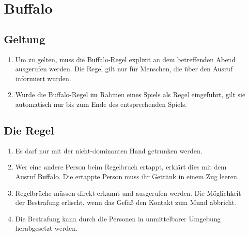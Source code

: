 \chapter{Buffalo}
\section{Geltung}
\begin{enumerate}[label={(\arabic*)}]
    \item
    Um zu gelten, muss die Buffalo-Regel explizit an dem betreffenden Abend ausgerufen werden.
    Die Regel gilt nur für Menschen, die über den Ausruf informiert wurden.

    \item
    Wurde die Buffalo-Regel im Rahmen eines Spiels als Regel eingeführt, gilt sie automatisch nur bis zum Ende des entsprechenden Spiels.
\end{enumerate}

\section{Die Regel}
\begin{enumerate}[label={(\arabic*)}]
    \item
    Es darf nur mit der nicht-dominanten Hand getrunken werden.

    \item
    Wer eine andere Person beim Regelbruch ertappt, erklärt dies mit dem Ausruf \glqq{}Buffalo\grqq{}.
    Die ertappte Person muss ihr Getränk in einem Zug leeren.

    \item
    Regelbrüche müssen direkt erkannt und ausgerufen werden.
    Die Möglichkeit der Bestrafung erlischt, wenn das Gefäß den Kontakt zum Mund abbricht.

    \item
    Die Bestrafung kann durch die Personen in unmittelbarer Umgebung herabgesetzt werden.
\end{enumerate}
